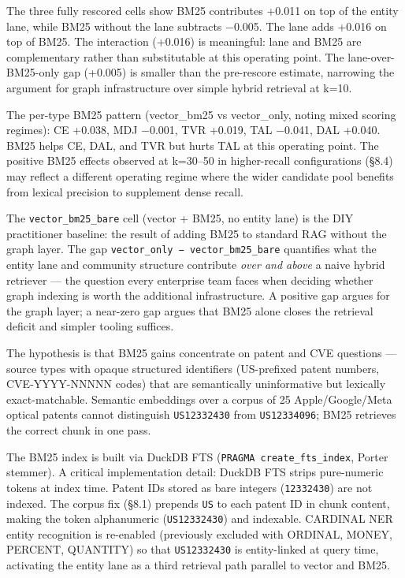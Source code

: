 \documentclass[
]{article}
\begin{document}
The three fully rescored cells show BM25 contributes +0.011 on top of
the entity lane, while BM25 without the lane subtracts −0.005. The lane
adds +0.016 on top of BM25. The interaction (+0.016) is meaningful: lane
and BM25 are complementary rather than substitutable at this operating
point. The lane-over-BM25-only gap (+0.005) is smaller than the
pre-rescore estimate, narrowing the argument for graph infrastructure
over simple hybrid retrieval at k=10.

The per-type BM25 pattern (vector\_bm25 vs vector\_only, noting mixed
scoring regimes): CE +0.038, MDJ −0.001, TVR +0.019, TAL −0.041, DAL
+0.040. BM25 helps CE, DAL, and TVR but hurts TAL at this operating
point. The positive BM25 effects observed at k=30--50 in higher-recall
configurations (§8.4) may reflect a different operating regime where the
wider candidate pool benefits from lexical precision to supplement dense
recall.

The \texttt{vector\_bm25\_bare} cell (vector + BM25, no entity lane) is
the DIY practitioner baseline: the result of adding BM25 to standard RAG
without the graph layer. The gap
\texttt{vector\_only\ −\ vector\_bm25\_bare} quantifies what the entity
lane and community structure contribute \emph{over and above} a naive
hybrid retriever --- the question every enterprise team faces when
deciding whether graph indexing is worth the additional infrastructure.
A positive gap argues for the graph layer; a near-zero gap argues that
BM25 alone closes the retrieval deficit and simpler tooling suffices.

The hypothesis is that BM25 gains concentrate on patent and CVE
questions --- source types with opaque structured identifiers
(US-prefixed patent numbers, CVE-YYYY-NNNNN codes) that are semantically
uninformative but lexically exact-matchable. Semantic embeddings over a
corpus of 25 Apple/Google/Meta optical patents cannot distinguish
\texttt{US12332430} from \texttt{US12334096}; BM25 retrieves the correct
chunk in one pass.

The BM25 index is built via DuckDB FTS
(\texttt{PRAGMA\ create\_fts\_index}, Porter stemmer). A critical
implementation detail: DuckDB FTS strips pure-numeric tokens at index
time. Patent IDs stored as bare integers (\texttt{12332430}) are not
indexed. The corpus fix (§8.1) prepends \texttt{US} to each patent ID in
chunk content, making the token alphanumeric (\texttt{US12332430}) and
indexable. CARDINAL NER entity recognition is re-enabled (previously
excluded with ORDINAL, MONEY, PERCENT, QUANTITY) so that
\texttt{US12332430} is entity-linked at query time, activating the
entity lane as a third retrieval path parallel to vector and BM25.
\end{document}
